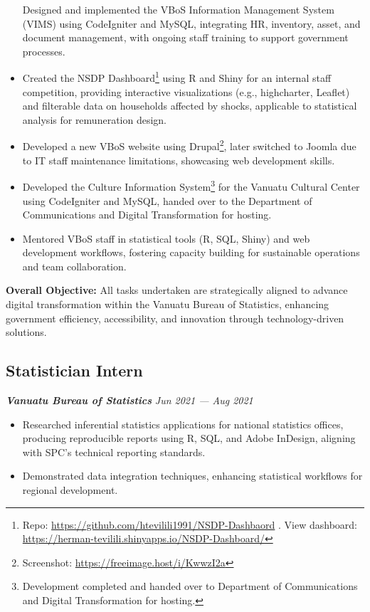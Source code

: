 \documentclass[
  letterpaper,
  DIV=11,
  numbers=noendperiod]{scrartcl}
\providecommand{\tightlist}{%
  \setlength{\itemsep}{0pt}\setlength{\parskip}{0pt}}
\begin{document}
\begin{itemize}
  Designed and implemented the VBoS Information Management System (VIMS)
  using CodeIgniter and MySQL, integrating HR, inventory, asset, and
  document management, with ongoing staff training to support government
  processes.
\item
  Created the NSDP Dashboard\footnote{Repo:
    \url{https://github.com/htevilili1991/NSDP-Dashbaord} . View
    dashboard:
    \url{https://herman-tevilili.shinyapps.io/NSDP-Dashboard/}} using R
  and Shiny for an internal staff competition, providing interactive
  visualizations (e.g., highcharter, Leaflet) and filterable data on
  households affected by shocks, applicable to statistical analysis for
  remuneration design.
\item
  Developed a new VBoS website using Drupal\footnote{Screenshot:
    \url{https://freeimage.host/i/KwwzI2a}}, later switched to Joomla
  due to IT staff maintenance limitations, showcasing web development
  skills.
\item
  Developed the Culture Information System\footnote{Development
    completed and handed over to Department of Communications and
    Digital Transformation for hosting.} for the Vanuatu Cultural Center
  using CodeIgniter and MySQL, handed over to the Department of
  Communications and Digital Transformation for hosting.
\item
  Mentored VBoS staff in statistical tools (R, SQL, Shiny) and web
  development workflows, fostering capacity building for sustainable
  operations and team collaboration.
\end{itemize}

\textbf{Overall Objective:} All tasks undertaken are strategically
aligned to advance digital transformation within the Vanuatu Bureau of
Statistics, enhancing government efficiency, accessibility, and
innovation through technology-driven solutions.

\subsection{Statistician Intern}\label{statistician-intern}

\textbf{\emph{Vanuatu Bureau of Statistics}} {\emph{Jun 2021 --- Aug
2021}}\\

\begin{itemize}
\tightlist
\item
  Researched inferential statistics applications for national statistics
  offices, producing reproducible reports using R, SQL, and Adobe
  InDesign, aligning with SPC's technical reporting standards.
\item
  Demonstrated data integration techniques, enhancing statistical
  workflows for regional development.
\end{itemize}
\end{document}
